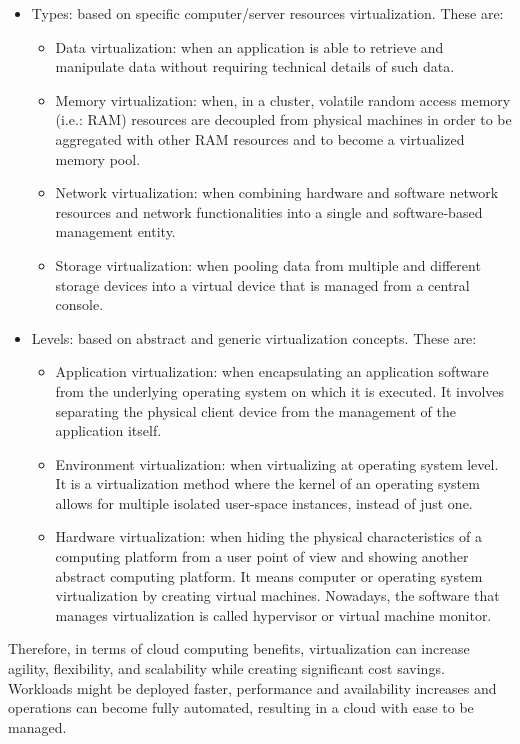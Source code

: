 \begin{itemize}
\item Types: based on specific computer/server resources virtualization. These are: 
\begin{itemize}
\item Data virtualization: when an application is able to retrieve and manipulate data without requiring technical details of such data.
\item Memory virtualization: when, in a cluster, volatile random access memory (i.e.: RAM) resources are decoupled from physical machines in order to be aggregated with other RAM resources and to become a virtualized memory pool.
\item Network virtualization: when combining hardware and software network resources and network functionalities into a single and software-based management entity.
\item Storage virtualization: when pooling data from multiple and different storage devices into a virtual device that is managed from a central console.
\end{itemize}
\item Levels: based on abstract and generic virtualization concepts. These are:
\begin{itemize}
\item Application virtualization: when encapsulating an application software from the underlying operating system on which it is executed. It involves separating the physical client device from the management of the application itself.
\item Environment virtualization: when virtualizing at operating system level. It is a virtualization method where the kernel of an operating system allows for multiple isolated user-space instances, instead of just one. 
\item Hardware virtualization: when hiding the physical characteristics of a computing platform from a user point of view and showing another abstract computing platform. It means computer or operating system virtualization by creating virtual machines.  Nowadays, the software that manages virtualization is called hypervisor or virtual machine monitor.
\end{itemize}
\end{itemize}

Therefore, in terms of cloud computing benefits, virtualization can increase agility, flexibility, and scalability while creating significant cost savings. Workloads might be deployed faster, performance and availability increases and operations can become fully automated, resulting in a cloud with ease to be managed. 

